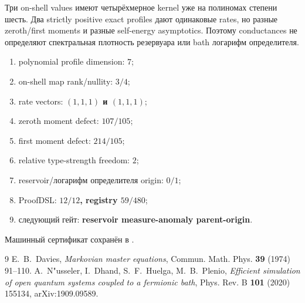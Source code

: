 \begin{nogocriterion}
Три on-shell values имеют четырёхмерное kernel уже на полиномах степени
шесть. Два strictly positive exact profiles дают одинаковые rates, но
разные zeroth/first moments и разные self-energy asymptotics. Поэтому
conductances не определяют спектральная плотность резервуара или bath логарифм определителя.
\end{nogocriterion}

\begin{protocol}\begin{enumerate}
\item polynomial profile dimension: \textbf{$7$};
\item on-shell map rank/nullity: \textbf{$3/4$};
\item rate vectors: \textbf{$(1,1,1)$ и $(1,1,1)$};
\item zeroth moment defect: \textbf{$107/105$};
\item first moment defect: \textbf{$214/105$};
\item relative type-strength freedom: \textbf{$2$};
\item reservoir/логарифм определителя origin: \textbf{$0/1$};
\item ProofDSL: \textbf{$12/12$, registry $59/480$};
\item следующий гейт: \textbf{reservoir measure-anomaly parent-origin}.
\end{enumerate}\end{protocol}

Машинный сертификат сохранён в
.

\begin{thebibliography}{9}
E.~B.~Davies,
\emph{Markovian master equations},
Commun. Math. Phys. \textbf{39} (1974) 91--110.
A.~N"usseler, I.~Dhand, S.~F.~Huelga, M.~B.~Plenio,
\emph{Efficient simulation of open quantum systems coupled to a fermionic bath},
Phys. Rev. B \textbf{101} (2020) 155134, arXiv:1909.09589.
\end{thebibliography}